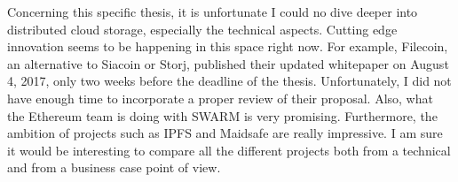 Concerning this specific thesis, it is unfortunate I could no dive deeper into distributed cloud storage, especially the technical aspects. Cutting edge innovation seems to be happening in this space right now. For example, Filecoin, an alternative to Siacoin or Storj, published their updated whitepaper on August 4, 2017, only two weeks before the deadline of the thesis. Unfortunately, I did not have enough time to incorporate a proper review of their proposal. Also, what the Ethereum team is doing with SWARM is very promising. Furthermore, the ambition of projects such as IPFS and Maidsafe are really impressive. I am sure it would be interesting to compare all the different projects both from a technical and from a business case point of view. 